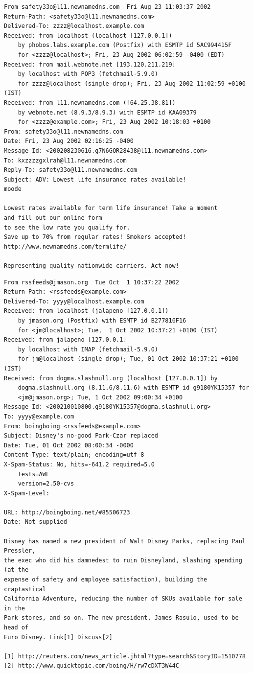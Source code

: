 \documentclass[
]{krantz}
\begin{document}
\begin{verbatim}
From safety33o@l11.newnamedns.com  Fri Aug 23 11:03:37 2002
Return-Path: <safety33o@l11.newnamedns.com>
Delivered-To: zzzz@localhost.example.com
Received: from localhost (localhost [127.0.0.1])
    by phobos.labs.example.com (Postfix) with ESMTP id 5AC994415F
    for <zzzz@localhost>; Fri, 23 Aug 2002 06:02:59 -0400 (EDT)
Received: from mail.webnote.net [193.120.211.219]
    by localhost with POP3 (fetchmail-5.9.0)
    for zzzz@localhost (single-drop); Fri, 23 Aug 2002 11:02:59 +0100 (IST)
Received: from l11.newnamedns.com ([64.25.38.81])
    by webnote.net (8.9.3/8.9.3) with ESMTP id KAA09379
    for <zzzz@example.com>; Fri, 23 Aug 2002 10:18:03 +0100
From: safety33o@l11.newnamedns.com
Date: Fri, 23 Aug 2002 02:16:25 -0400
Message-Id: <200208230616.g7N6GOR28438@l11.newnamedns.com>
To: kxzzzzgxlrah@l11.newnamedns.com
Reply-To: safety33o@l11.newnamedns.com
Subject: ADV: Lowest life insurance rates available!                                                   
moode

Lowest rates available for term life insurance! Take a moment 
and fill out our online form 
to see the low rate you qualify for. 
Save up to 70% from regular rates! Smokers accepted! 
http://www.newnamedns.com/termlife/ 
          
Representing quality nationwide carriers. Act now!
\end{verbatim}

\begin{verbatim}
From rssfeeds@jmason.org  Tue Oct  1 10:37:22 2002
Return-Path: <rssfeeds@example.com>
Delivered-To: yyyy@localhost.example.com
Received: from localhost (jalapeno [127.0.0.1])
    by jmason.org (Postfix) with ESMTP id B277816F16
    for <jm@localhost>; Tue,  1 Oct 2002 10:37:21 +0100 (IST)
Received: from jalapeno [127.0.0.1]
    by localhost with IMAP (fetchmail-5.9.0)
    for jm@localhost (single-drop); Tue, 01 Oct 2002 10:37:21 +0100 (IST)
Received: from dogma.slashnull.org (localhost [127.0.0.1]) by
    dogma.slashnull.org (8.11.6/8.11.6) with ESMTP id g9180YK15357 for
    <jm@jmason.org>; Tue, 1 Oct 2002 09:00:34 +0100
Message-Id: <200210010800.g9180YK15357@dogma.slashnull.org>
To: yyyy@example.com
From: boingboing <rssfeeds@example.com>
Subject: Disney's no-good Park-Czar replaced
Date: Tue, 01 Oct 2002 08:00:34 -0000
Content-Type: text/plain; encoding=utf-8
X-Spam-Status: No, hits=-641.2 required=5.0
    tests=AWL
    version=2.50-cvs
X-Spam-Level: 

URL: http://boingboing.net/#85506723
Date: Not supplied

Disney has named a new president of Walt Disney Parks, replacing Paul Pressler, 
the exec who did his damnedest to ruin Disneyland, slashing spending (at the 
expense of safety and employee satisfaction), building the craptastical 
California Adventure, reducing the number of SKUs available for sale in the 
Park stores, and so on. The new president, James Rasulo, used to be head of 
Euro Disney. Link[1] Discuss[2]

[1] http://reuters.com/news_article.jhtml?type=search&StoryID=1510778
[2] http://www.quicktopic.com/boing/H/rw7cDXT3W44C
\end{verbatim}
\end{document}
